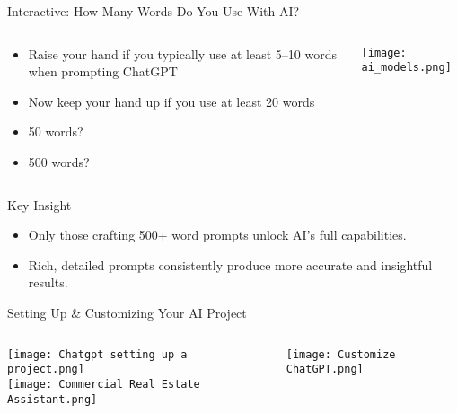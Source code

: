 \documentclass{beamer}
\begin{document}
\begin{frame}{Interactive: How Many Words Do You Use With AI?}
  \begin{columns}[c]
    \begin{column}{0.6\textwidth}
      \begin{itemize}
        \item Raise your hand if you typically use at least 5–10 words when prompting ChatGPT
        \item Now keep your hand up if you use at least 20 words
        \item 50 words?
        \item 500 words?
      \end{itemize}
    \end{column}

    \begin{column}{0.4\textwidth}
      \vspace{0.4cm}  %
      \centering
      \texttt{[image: ai\_models.png]}
    \end{column}
  \end{columns}

  \vspace{0.2cm}\pause
    \begin{block}{Key Insight}
    \small
      \begin{itemize}
        \item Only those crafting 500+ word prompts unlock AI’s full capabilities.
        \item Rich, detailed prompts consistently produce more accurate and insightful results.
      \end{itemize}
\end{block}

\end{frame}


\begin{frame}{Setting Up \& Customizing Your AI Project}
  \begin{columns}
    \begin{column}{0.44\textwidth}
      \centering
      \texttt{[image: Chatgpt setting up a project.png]}\\[1ex]
      \texttt{[image: Commercial Real Estate Assistant.png]}
    \end{column}

    \begin{column}{0.48\textwidth}
      \centering
      \texttt{[image: Customize ChatGPT.png]}
    \end{column}
  \end{columns}
\end{frame}
\end{document}
